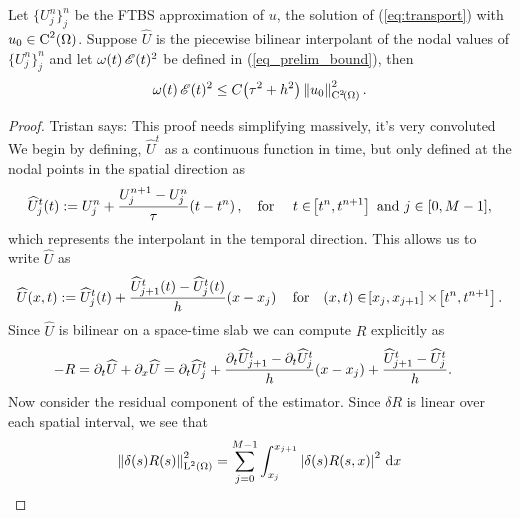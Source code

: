 \documentclass[final]{amsart}
\renewcommand{\d}{\ensuremath{\,\mathrm{d}}}
\newcommand{\tristan}[1]{{\color{purple} Tristan says:  #1 }}
\numberwithin{equation}{section}
\begin{document}
\begin{Lem}
	\label{subsec:asymptotic_convergence_rate}
	Let $\{ U^n_j \}_{j}^{n}$ be the FTBS approximation of $u$, the
	solution of (\ref{eq:transport}) with $u_0 \in
	\operatorname C^{2}(\Omega)$. Suppose $\widehat U$ is the piecewise bilinear
	interpolant of the nodal values of $\{ U^n_j \}_{j}^{n}$ and let
	$\omega\!\left({t}\right)\mathscr E(t)^2$ be defined in (\ref{eq_prelim_bound}), then
	\begin{equation}
	\omega\!\left({t}\right)\mathscr E(t)^2 \leq C \!\left({\tau^2 + h^2}\right)\left\|u_0\right\|_{\operatorname C^{2}\!\left({\Omega}\right)}^2.
	\end{equation}
\end{Lem}
\begin{proof}
  \tristan{This proof needs simplifying massively, it's very convoluted}
	We begin by defining, $\widehat{U}^t$ as a continuous function
        in time, but only defined at the nodal points in the spatial
        direction as
	\begin{equation}
	\widehat{U}^t_j\!\left({t}\right)
	:=
	U^n_j +\frac{U^{n+1}_j
		-
		U^n_j}{\tau}\!\left({t-t^n}\right), \quad \text{for }\quad t \in \!\left[{t^n,
		t^{n+1}}\right]  \text{ and } j\in [0,M-1],
	\end{equation}
	which represents the interpolant in the temporal
        direction. This allows us to write $\widehat{U}$ as
	\begin{equation}
	\widehat{U}\qp{x,t}
	:=
	\widehat{U}^t_j\qp{t} + \frac{\widehat{U}_{j+1}^t\qp{t}-\widehat{U}_j^t\qp{t} }{h}\qp{x-x_j}\quad\text{for}\quad \qp{x,t}\in \qb{x_j, x_{j+1}}\times\qb{t^n, t^{n+1}}.
	\end{equation}
	Since $\widehat{U}$ is bilinear on a space-time slab we can compute
	$R$ explicitly as
	\begin{equation}
	\label{eq:Reqn}
	\begin{aligned}
	-R
	=
	\partial_t \widehat{U}
	+
	\partial_x \widehat{U}
	&=
	\partial_t \widehat{U}^t_j
	+
	\frac{\partial_t\widehat{U}_{j+1}^t-\partial_t\widehat{U}_j^t}{h}\!\left({x-x_j}\right)
	+
	\frac{\widehat{U}_{j+1}^t-\widehat{U}_j^t}{h}.
	\end{aligned}
	\end{equation}
	Now consider the residual component of the estimator. Since
	$\delta R$ is linear over each spatial interval, we see that
	\begin{equation}
	\begin{split}
	\Norm{\delta(s) R(s)}_{\leb{2}(\W)}^2
	&=
	\sum_{j=0}^{M-1}\int_{x_j}^{x_{j+1}} \norm{\delta(s) R(s,x)}^2 \d x
	\\

\end{split}
\end{equation}
\end{proof}
\end{document}
